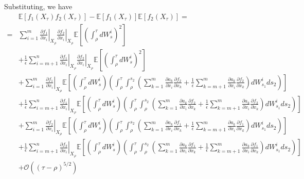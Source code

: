 \documentclass[12pt]{article}
\begin{document}
Substituting, we have
\begin{equation}
\begin{aligned}
& \mathbb{E} [f_1(X_\tau) f_2(X_\tau) ] - \mathbb{E}[f_1(X_\tau)]\mathbb{E}[f_2(X_\tau)]= \\
=  &  \sum_{i=1}^m  \left. \frac{\partial f_1}{\partial x_i} \right|_{X_\rho} \left. \frac{\partial f_2}{\partial x_i} \right|_{X_\rho}  \mathbb{E} \left[ \left(\int_\rho^\tau dW_s^i \right)^2  \right] \\
& + \frac{1}{\epsilon} \sum_{i=m+1}^n  \left. \frac{\partial f_1}{\partial x_i} \right|_{X_\rho} \left. \frac{\partial f_2}{\partial x_i} \right|_{X_\rho}  \mathbb{E} \left[ \left(\int_\rho^\tau dW_s^i \right)^2  \right] \\
 & + \sum_{i=1}^m \left. \frac{\partial f_1}{\partial x_i} \right|_{X_\rho}  \mathbb{E} \left[ \left(\int_\rho^\tau dW_s^i \right)  \left(\int_\rho^\tau \int_{\rho}^{s_2} \left(  \sum_{k=1}^m \frac{\partial a_k}{\partial x_i} \frac{\partial f_2}{\partial x_k}  + \frac{1}{\epsilon} \sum_{k=m+1}^m \frac{\partial a_k }{\partial x_i} \frac{\partial f_2}{\partial x_k} \right)  dW_{s_1}^i ds_2 \right) \right] \\ 
 & + \frac{1}{\epsilon} \sum_{i=m+1}^n \left. \frac{\partial f_1}{\partial x_i} \right|_{X_\rho}  \mathbb{E} \left[ \left(\int_\rho^\tau dW_s^i \right)  \left(\int_\rho^\tau \int_{\rho}^{s_2} \left(  \sum_{k=1}^m \frac{\partial a_k}{\partial x_i} \frac{\partial f_2}{\partial x_k}  + \frac{1}{\epsilon} \sum_{k=m+1}^m \frac{\partial a_k }{\partial x_i} \frac{\partial f_2}{\partial x_k} \right)  dW_{s_1}^i ds_2 \right) \right] \\ 
 & + \sum_{i=1}^m  \left. \frac{\partial f_2}{\partial x_i} \right|_{X_\rho}  \mathbb{E} \left[ \left(\int_\rho^\tau dW_s^i \right)  \left(\int_\rho^\tau \int_{\rho}^{s_2} \left(  \sum_{k=1}^m \frac{\partial a_k}{\partial x_i} \frac{\partial f_1}{\partial x_k}  + \frac{1}{\epsilon} \sum_{k=m+1}^m \frac{\partial a_k }{\partial x_i} \frac{\partial f_1}{\partial x_k} \right) dW_{s_1}^i ds_2 \right) \right] \\
& + \frac{1}{\epsilon} \sum_{i=m+1}^n  \left. \frac{\partial f_2}{\partial x_i} \right|_{X_\rho}  \mathbb{E} \left[ \left(\int_\rho^\tau dW_s^i \right)  \left(\int_\rho^\tau \int_{\rho}^{s_2} \left(  \sum_{k=1}^m \frac{\partial a_k}{\partial x_i} \frac{\partial f_1}{\partial x_k}  + \frac{1}{\epsilon} \sum_{k=m+1}^m \frac{\partial a_k }{\partial x_i} \frac{\partial f_1}{\partial x_k} \right) dW_{s_1}^i ds_2 \right) \right] \\
& + \mathcal{O} ((\tau - \rho)^{5/2})
 \end{aligned}
\end{equation}
\end{document}
